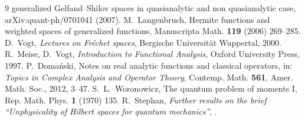 \documentclass[11pt]{article}
\theoremstyle{definition}
\begin{document}
\begin{thebibliography}{9}
  generalized Gelfand--Shilov spaces in quasianalytic and non quasianalytic case,
  arXiv:quant-ph/0701041 (2007).
 M.~Langenbruch, Hermite functions and weighted spaces of generalized functions,
  Manuscripta Math. \textbf{119} (2006) 269--285.
 D.~Vogt, \emph{Lectures on Fr\'echet spaces}, Bergische Universit\"at Wuppertal,
  2000.
 R.~Meise, D.~Vogt, \emph{Introduction to Functional Analysis}, Oxford University
  Press, 1997.
 P.~Doma\'nski, Notes on real analytic functions and classical operators, in:
  \emph{Topics in Complex Analysis and Operator Theory}, Contemp. Math. \textbf{561}, Amer. Math.
  Soc., 2012, 3--47.
 S.~L.~Woronowicz, The quantum problem of moments I, Rep. Math. Phys.
  \textbf{1} (1970) 135.
 R.~Stephan, \emph{Further results on the brief ``Unphysicality of
  Hilbert spaces for quantum mechanics''}, .
\end{thebibliography}
\end{document}
